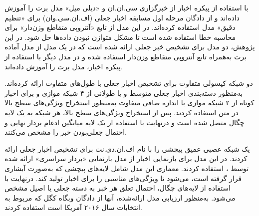 \citet{jwa2019exbake} با استفاده از پیکره اخبار از خبرگزاری سی.ان.ان و  «دیلی میل» مدل برت را آموزش داده‌اند و از دادگان مرحله اول مسابقه اخبار جعلی (اف.ان.سی.وان) برای «تنظیم دقیق» مدل استفاده کرده‌اند. در این مدل از تابع «آنتروپی متقاطع وزن‌دار» برای محاسبه خطا استفاده شده‌ است تا مشکل متوازن نبودن داده‌ها حل شود. در این پژوهش، دو مدل برای تشخیص خبر جعلی ارائه شده ‌است که در یک مدل از مدل آماده برت به‌همراه تابع آنتروپی متقاطع وزن‌دار استفاده شده و در مدل دیگر با استفاده از پیکره اخبار، مدل برت را آموزش داده‌اند. %

\cite{goldani2020detecting} دو شبکه کپسولی متفاوت برای تشخیص اخبار جعلی با طول‌های متفاوت ارائه کرده‌اند. به‌منظور دسته‌بندی اخبار جعلی متوسط و یا طولانی از ۴ شبکه موازی و برای اخبار کوتاه از ۲ شبکه موازی با اندازه صافی  متفاوت به‌منظور استخراج ویژگی‌های سطح بالا در متن استفاده کردند. پس از استخراج ویژگی‌های سطح بالا، هر شبکه به یک لایه چگال متصل شده‌ است و درنهایت با استفاده از یک لایه میانگین ادغام بردار نهایی و احتمال جعلی‌بودن خبر را مشخص می‌کنند. %

\citet{kaliyar2020fndnet}
 یک شبکه عصبی عمیق پیچشی را با نام اف.ان.دی.نت برای تشخیص اخبار جعلی ارائه کردند. در این مدل برای بازنمایی اخبار از مدل بازنمایی «بردار سراسری» ارائه شده توسط \cite{pennington2014glove}، استفاده کردند. معماری این مدل شامل لایه‌های پیچشی که به‌صورت آبشاری قرار گرفته‌ است، می‌شود‌ تا ویژگی‌های مناسبی را برای اخبار تولید کند. درنهایت با استفاده از لایه‌های چگال، احتمال تعلق هر خبر به دسته جعلی یا اصیل مشخص می‌شود. به‌منظور ارزیابی مدل ارائه‌شده، آنها از دادگان وبگاه کگل که مربوط به انتخابات سال ۲۰۱۶ آمریکا است استفاده کردند.
 
